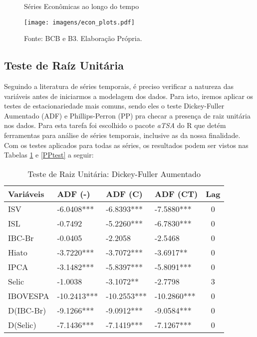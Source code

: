 \begin{figure}[!h]
    \centering
    \caption{Séries Econômicas ao longo do tempo}
    \texttt{[image: imagens/econ\_plots.pdf]}
    \label{fig: econ_plots}
    \caption*{Fonte: BCB e B3. Elaboração Própria.}
\end{figure}

\subsection{Teste de Raíz Unitária}

Seguindo a literatura de séries temporais, é preciso verificar a natureza das variáveis antes de iniciarmos a modelagem dos dados. Para isto, iremos aplicar os testes de estacionariedade mais comuns, sendo eles o teste Dickey-Fuller Aumentado (ADF) e Phillips-Perron (PP) pra checar a presença de raiz unitária nos dados. Para esta tarefa foi escolhido o pacote \textit{aTSA} \cite{aTSA} do R \cite{R} que detém ferramentas para análise de séries temporais, inclusive as da nossa finalidade. Com os testes aplicados para todas as séries, os resultados podem ser vistos nas Tabelas \ref{ADFtest} e \ref{PPtest} a seguir:

\begin{table}[!h]
    \centering
    \caption{Teste de Raiz Unitária: Dickey-Fuller Aumentado}
    \begin{tabular}{llllc}
    \hline
Variáveis & ADF (-) & ADF (C) & ADF (CT) & Lag \\
    \hline
ISV       & -6.0408*** & -6.8393*** & -7.5880*** & 0 \\
ISL       & -0.7492    & -5.2260*** & -6.7830*** & 0 \\
IBC-Br    & -0.0405    & -2.2058    & -2.5468    & 0 \\
Hiato     & -3.7220*** & -3.7072*** & -3.6917**  & 0 \\
IPCA      & -3.1482*** & -5.8397*** & -5.8091*** & 0 \\
Selic     & -1.0038    & -3.1072**  & -2.7798    & 3 \\
IBOVESPA  & -10.2413***& -10.2553***& -10.2860***& 0 \\
D(IBC-Br) & -9.1266*** & -9.0912*** & -9.0584*** & 0 \\
D(Selic)  & -7.1436*** & -7.1419*** & -7.1267*** & 0 \\
    \hline
    \end{tabular} \label{ADFtest}
\end{table}

